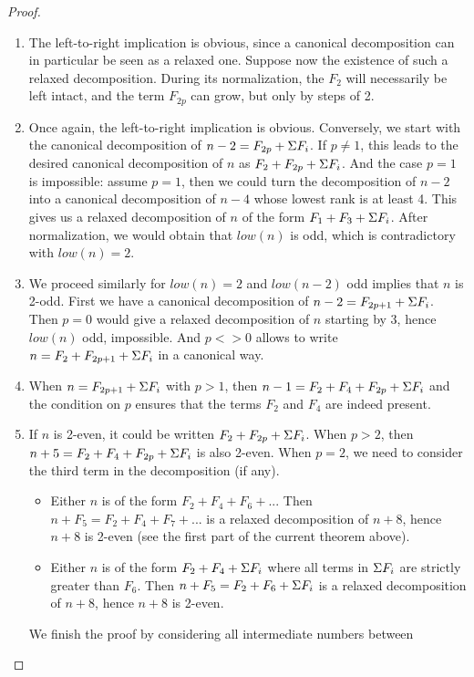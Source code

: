 \documentclass[a4paper,11pt]{article}
\begin{document}
\begin{proof}
\noindent
\begin{enumerate}
\item
  The left-to-right implication is obvious, since a canonical
  decomposition can in particular be seen as a relaxed one. Suppose
  now the existence of such a relaxed decomposition. During its
  normalization, the $F_2$ will necessarily be left intact, and the
  term $F_{2p}$ can grow, but only by steps of 2.
\item Once again, the left-to-right implication is
  obvious. Conversely, we start with the canonical decomposition of
  $n-2=F_{2p}+\Sigma F_i$. If $p\neq 1$, this leads to the desired canonical
  decomposition of $n$ as $F_2+F_{2p}+\Sigma F_i$. And the case $p=1$ is
  impossible: assume $p=1$, then we could turn the
  decomposition of $n-2$ into a canonical decomposition of $n-4$
  whose lowest rank is at least 4. This gives us a relaxed
  decomposition of $n$ of the form $F_1+F_3+\Sigma F_i$. After normalization,
  we would obtain that $low(n)$ is odd, which is contradictory with
  $low(n)=2$.
\item We proceed similarly for $low(n)=2$ and $low(n-2)$ odd implies
  that $n$ is 2-odd. First we have a canonical decomposition of
  $n-2 = F_{2p+1} + \Sigma F_i$. Then $p=0$ would give a relaxed
  decomposition of $n$ starting by 3, hence $low(n)$ odd, impossible.
  And $p<>0$ allows to write $n = F_2+F_{2p+1}+\Sigma F_i$ in a canonical way.
\item When $n = F_{2p+1}+\Sigma F_i$ with $p>1$, then $n-1 = F_2+F_4+F_{2p}+\Sigma F_i$
  and the condition on $p$ ensures that the terms $F_2$ and $F_4$ are
  indeed present.
\item If $n$ is 2-even, it could be written $F_2+F_{2p}+\Sigma F_i$.
  When $p>2$, then $n+5 = F_2+F_4+F_{2p}+\Sigma F_i$ is also 2-even.
  When $p=2$, we need to consider the third term in the decomposition
  (if any).
  \begin{itemize}
  \item Either $n$ is of the form $F_2+F_4+F_6+...$
    Then $n+F_5 = F_2 + F_4 + F_7 + ...$ is a relaxed
    decomposition of $n+8$, hence $n+8$ is 2-even (see the first
    part of the current theorem above).
  \item Either $n$ is of the form $F_2+F_4+\Sigma F_i$
    where all terms in $\Sigma F_i$ are strictly greater than $F_6$.
    Then $n+F_5 = F_2 + F_6 + \Sigma F_i$ is a relaxed
    decomposition of $n+8$, hence $n+8$ is 2-even.
  \end{itemize}
  We finish the proof by considering all intermediate numbers between

\end{enumerate}
\end{proof}
\end{document}
